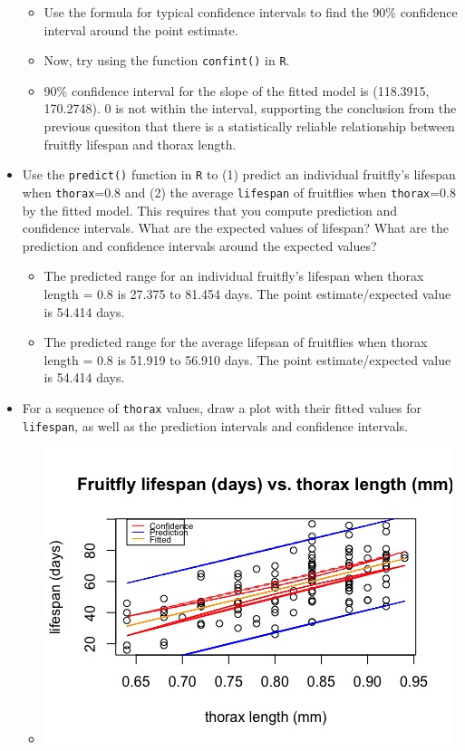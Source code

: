 \documentclass[12pt,letterpaper]{article}
\begin{document}
\begin{itemize}
			\vspace{.5cm}
	\begin{itemize}
		\item
		Use the formula for typical confidence intervals to find the 90\% confidence interval around the point estimate.		\vspace{.5cm}
		\item
		Now, try using the function  \texttt{confint()}  in \texttt{R}.
		\item
		90\% confidence interval for the slope of the fitted model is (118.3915, 170.2748). 0 is not within the interval, supporting the conclusion from the previous quesiton that there is a statistically reliable relationship between fruitfly lifespan and thorax length.
	\end{itemize}
	
			\vspace{1cm}
	\item Use the \texttt{predict()} function in \texttt{R} to (1) predict an individual fruitfly's lifespan when \texttt{thorax}=0.8 and (2) the average \texttt{lifespan} of fruitflies when \texttt{thorax}=0.8 by the fitted model. This requires that you compute prediction and confidence intervals. What are the expected values of lifespan? What are the prediction and confidence intervals around the expected values? 
	\begin{itemize}
	\item
	The predicted range for an individual fruitfly's lifespan when thorax length = 0.8 is 27.375 to 81.454 days. The point estimate/expected value is 54.414 days.
	\item
	The predicted range for the average lifepsan of fruitflies when thorax length = 0.8 is 51.919 to 56.910 days. The point estimate/expected value is 54.414 days.
	\end{itemize}
	
			\vspace{0.5cm}
	\item	For a sequence of \texttt{thorax} values, draw a plot with their fitted values for \texttt{lifespan}, as well as the prediction intervals and confidence intervals.
	\begin{itemize}
		\item 
	\includegraphics{confpredicplot2}

\end{itemize}
\end{itemize}
\end{document}
